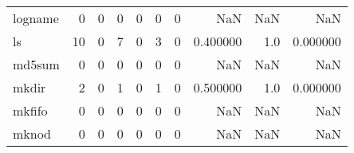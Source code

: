 \begin{tabular}{lrrrrrrrrr}
logname   &                                                  0 &                                                  0 &                                                  0 &                                                  0 &                                                  0 &                                                  0 &                                                NaN &                                    NaN &                                  NaN \\
ls        &                                                 10 &                                                  0 &                                                  7 &                                                  0 &                                                  3 &                                                  0 &                                           0.400000 &                                    1.0 &                             0.000000 \\
md5sum    &                                                  0 &                                                  0 &                                                  0 &                                                  0 &                                                  0 &                                                  0 &                                                NaN &                                    NaN &                                  NaN \\
mkdir     &                                                  2 &                                                  0 &                                                  1 &                                                  0 &                                                  1 &                                                  0 &                                           0.500000 &                                    1.0 &                             0.000000 \\
mkfifo    &                                                  0 &                                                  0 &                                                  0 &                                                  0 &                                                  0 &                                                  0 &                                                NaN &                                    NaN &                                  NaN \\
mknod     &                                                  0 &                                                  0 &                                                  0 &                                                  0 &                                                  0 &                                                  0 &                                                NaN &                                    NaN &                                  NaN \\

\end{tabular}
